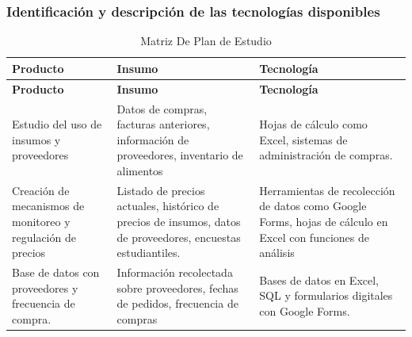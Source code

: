 \documentclass[letterpaper, 11pt]{report}
\begin{document}
\subsubsection{Identificación y descripción de las tecnologías disponibles}

\begin{longtable}{|p{.3\linewidth}|p{.3\linewidth}|p{.3\linewidth}|}
      \caption{Matriz De Plan de Estudio}                                                                                                                                 \\
      \hline
      \textbf{Producto}                                                    & \textbf{Insumo}                                                        & \textbf{Tecnología} \\
      \hline
      \endfirsthead

      \hline
      \textbf{Producto}                                                    & \textbf{Insumo}                                                        & \textbf{Tecnología} \\
      \hline
      \endhead

      \hline
      \endfoot

      \hline
      \endlastfoot

      Estudio del uso de insumos y proveedores                             & Datos de compras, facturas
      anteriores, información de proveedores, inventario de alimentos      & Hojas de
      cálculo como Excel, sistemas de administración de compras.                                                                                                          \\\hline

      Creación de mecanismos de monitoreo y regulación de precios          & Listado de
      precios actuales, histórico de precios de insumos, datos de proveedores,
      encuestas estudiantiles.                                             & Herramientas de recolección de datos como Google
      Forms, hojas de cálculo en Excel con funciones de análisis                                                                                                          \\\hline

      Base de datos con proveedores y frecuencia de compra.                & Información recolectada
      sobre proveedores, fechas de pedidos, frecuencia de compras          & Bases de datos en
      Excel, SQL y formularios digitales con Google Forms.                                                                                                                \\\hline


\end{longtable}
\end{document}
